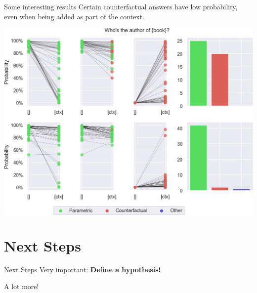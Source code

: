 \documentclass[9pt]{beamer}
\begin{document}
\begin{frame}{Some interesting results}
	Certain counterfactual answers have low probability, even when being added as part of the context.

	\vfill{}

	\centering
	\includegraphics[width=.8\textwidth]{../figures/llama_1119.png}
\end{frame}

\section{Next Steps}
\begin{frame}{Next Steps}
	\Large
	Very important: \textbf{Define a hypothesis!}

	A lot more!
\end{frame}
\end{document}
